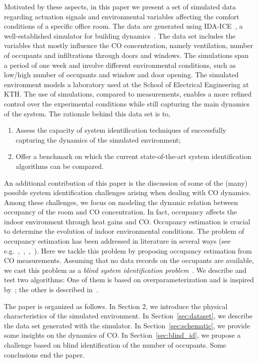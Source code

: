 \documentclass{article}
\begin{document}
Motivated by these aspects, in this paper we present a set of simulated data
regarding actuation signals and environmental variables affecting the comfort
conditions of a specific office room. The data are generated using
IDA-ICE~\citeauthor{equa2015equa}, a well-established simulator for building
dynamics~\cite{crawley2008contrasting}. The data set includes the
variables that mostly influence the CO concentration, namely
ventilation, number of occupants and infiltrations through doors and windows. The
simulations span a period of one week and involve different environmental
conditions, such as low/high number of occupants and window and door opening.
The simulated environment models a laboratory used at the School of Electrical
Engineering at KTH\@. The use of simulations, compared to measurements, enables a
more refined control over the experimental conditions while still capturing the
main dynamics of the system. The rationale behind this data set is to,
\begin{enumerate}
  \item Assess the capacity of system identification techniques of successfully
    capturing the dynamics of the simulated environment;
  \item Offer a benchmark on
    which the current state-of-the-art system identification algorithms can be
    compared.
\end{enumerate}

An additional contribution of this paper is the discussion of some of the
(many) possible system identification challenges arising when dealing with
CO dynamics. Among these challenges, we focus on modeling the dynamic
relation between occupancy of the room and CO concentration.
In fact, occupancy affects the indoor environment through heat gains and
CO. Occupancy estimation is crucial to determine the evolution of indoor
environmental conditions. The problem of occupancy estimation has been
addressed in literature in several ways (see
e.g.~\cite{han2012occupancy},~\cite{liao2012agent},~\cite{ai2014occupancy},~\cite{ebadat2013estimation}).
Here we tackle this problem by proposing occupancy estimation from
CO measurements. Assuming that no data records on the occupants are
available, we cast this problem as a \emph{blind system identification
problem}~\cite{abedmeraim1997blind}. We describe and
test two algorithms: One of them is based on overparameterization and is
inspired by~\cite{bai1998optimal}; the other is described in~\cite{bottegal2015blind}.

The paper is organized as follows. In Section 2, we introduce the
physical characteristics of the simulated environment. In Section~\ref{sec:dataset}, we describe the data set generated with the simulator. In
Section~\ref{sec:schematic}, we provide some insights on the dynamics of
CO. In Section~\ref{sec:blind_id}, we propose a challenge based on blind
identification of the number of occupants. Some conclusions end the paper.
\end{document}
